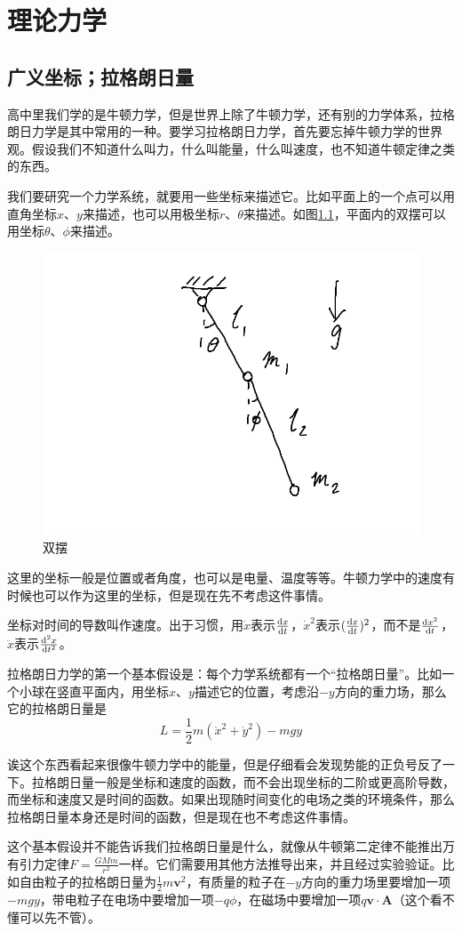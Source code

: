 \chapter{理论力学}
\section{广义坐标；拉格朗日量}
高中里我们学的是牛顿力学，但是世界上除了牛顿力学，还有别的力学体系，拉格朗日力学是其中常用的一种。要学习拉格朗日力学，首先要忘掉牛顿力学的世界观。假设我们不知道什么叫力，什么叫能量，什么叫速度，也不知道牛顿定律之类的东西。

我们要研究一个力学系统，就要用一些坐标来描述它。比如平面上的一个点可以用直角坐标$x$、$y$来描述，也可以用极坐标$r$、$\theta$来描述。如图\ref{fig-double-pend}，平面内的双摆可以用坐标$\theta$、$\phi$来描述。
\begin{figure}[htb]
\centering
\includegraphics[width=0.33\linewidth]{fig/double-pend.png}
\caption{双摆}
\label{fig-double-pend}
\end{figure}

这里的坐标一般是位置或者角度，也可以是电量、温度等等。牛顿力学中的速度有时候也可以作为这里的坐标，但是现在先不考虑这件事情。

坐标对时间的导数叫作速度。出于习惯，用$\dot x$表示$\frac{\mathop{}\!\mathrm{d} x}{\mathop{}\!\mathrm{d} t}$，$\dot x^2$表示$(\frac{\mathop{}\!\mathrm{d} x}{\mathop{}\!\mathrm{d} t})^2$，而不是$\frac{\mathop{}\!\mathrm{d} x^2}{\mathop{}\!\mathrm{d} t}$，$\ddot x$表示$\frac{\mathop{}\!\mathrm{d}^2 x}{\mathop{}\!\mathrm{d} t^2}$。

拉格朗日力学的第一个基本假设是：每个力学系统都有一个“拉格朗日量”。比如一个小球在竖直平面内，用坐标$x$、$y$描述它的位置，考虑沿$-y$方向的重力场，那么它的拉格朗日量是
\begin{equation*}
L=\frac{1}{2}m(\dot x^2+\dot y^2)-m g y
\end{equation*}

诶这个东西看起来很像牛顿力学中的能量，但是仔细看会发现势能的正负号反了一下。拉格朗日量一般是坐标和速度的函数，而不会出现坐标的二阶或更高阶导数，而坐标和速度又是时间的函数。如果出现随时间变化的电场之类的环境条件，那么拉格朗日量本身还是时间的函数，但是现在也不考虑这件事情。

这个基本假设并不能告诉我们拉格朗日量是什么，就像从牛顿第二定律不能推出万有引力定律$F=\frac{G M m}{r^2}$一样。它们需要用其他方法推导出来，并且经过实验验证。比如自由粒子的拉格朗日量为$\frac{1}{2}m \mathbf{v}^2$，有质量的粒子在$-y$方向的重力场里要增加一项$-m g y$，带电粒子在电场中要增加一项$-q \phi$，在磁场中要增加一项$q \mathbf{v} \cdot \mathbf{A}$（这个看不懂可以先不管）。

